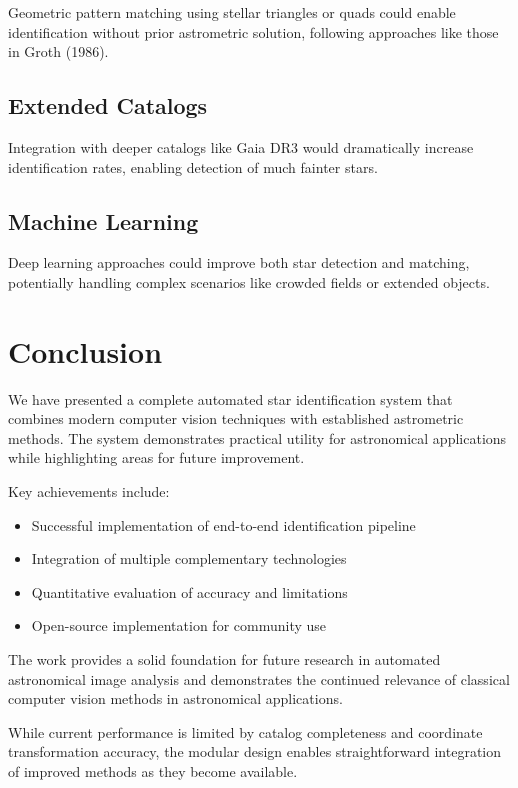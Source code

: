 \documentclass[11pt,a4paper]{article}
\begin{document}
Geometric pattern matching using stellar triangles or quads could enable identification without prior astrometric solution, following approaches like those in Groth (1986).

\subsection{Extended Catalogs}

Integration with deeper catalogs like Gaia DR3 would dramatically increase identification rates, enabling detection of much fainter stars.

\subsection{Machine Learning}

Deep learning approaches could improve both star detection and matching, potentially handling complex scenarios like crowded fields or extended objects.

\section{Conclusion}

We have presented a complete automated star identification system that combines modern computer vision techniques with established astrometric methods. The system demonstrates practical utility for astronomical applications while highlighting areas for future improvement.

Key achievements include:
\begin{itemize}
    \item Successful implementation of end-to-end identification pipeline
    \item Integration of multiple complementary technologies
    \item Quantitative evaluation of accuracy and limitations
    \item Open-source implementation for community use
\end{itemize}

The work provides a solid foundation for future research in automated astronomical image analysis and demonstrates the continued relevance of classical computer vision methods in astronomical applications.

While current performance is limited by catalog completeness and coordinate transformation accuracy, the modular design enables straightforward integration of improved methods as they become available.
\end{document}
